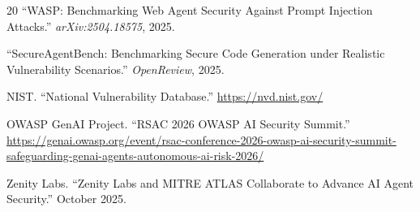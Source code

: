 \documentclass[11pt,twocolumn]{article}
\begin{document}
\begin{thebibliography}{20}
``WASP: Benchmarking Web Agent Security Against Prompt Injection Attacks.'' \textit{arXiv:2504.18575}, 2025.

``SecureAgentBench: Benchmarking Secure Code Generation under Realistic Vulnerability Scenarios.'' \textit{OpenReview}, 2025.

NIST. ``National Vulnerability Database.'' \url{https://nvd.nist.gov/}

OWASP GenAI Project. ``RSAC 2026 OWASP AI Security Summit.'' \url{https://genai.owasp.org/event/rsac-conference-2026-owasp-ai-security-summit-safeguarding-genai-agents-autonomous-ai-risk-2026/}

Zenity Labs. ``Zenity Labs and MITRE ATLAS Collaborate to Advance AI Agent Security.'' October 2025.

\end{thebibliography}
\end{document}
